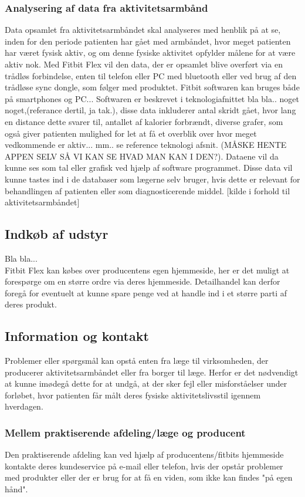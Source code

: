\subsubsection{Analysering af data fra aktivitetsarmbånd}  
Data opsamlet fra aktivitetsarmbåndet skal analyseres med henblik på at se, inden for den periode patienten har gået med armbåndet, hvor meget patienten har været fysisk aktiv, og om denne fysiske aktivitet opfylder målene for at være aktiv nok.  
Med Fitbit Flex vil den data, der er opsamlet blive overført via en trådløs forbindelse, enten til telefon eller PC med bluetooth eller ved brug af den trådløse sync dongle, som følger med produktet. Fitbit softwaren kan bruges både på smartphones og PC... Softwaren er beskrevet i teknologiafnittet bla bla.. noget noget,(referance dertil, ja tak.), disse data inkluderer antal skridt gået, hvor lang en distance dette svarer til, antallet af kalorier forbrændt, diverse grafer, som også giver patienten mulighed for let at få et overblik over hvor meget vedkommende er aktiv... mm.. se reference teknologi afsnit. (MÅSKE HENTE APPEN SELV SÅ VI KAN SE HVAD MAN KAN I DEN?). Dataene vil da kunne ses som tal eller grafisk ved hjælp af software programmet. Disse data vil kunne tastes ind i de databaser som lægerne selv bruger, hvis dette er relevant for behandlingen af patienten eller som diagnosticerende middel. [kilde i forhold til aktivitetsarmbåndet]

\subsection{Indkøb af udstyr}	
Bla bla...\\
Fitbit Flex kan købes over producentens egen hjemmeside, her er det muligt at forespørge om en større ordre via deres hjemmeside. Detailhandel kan derfor foregå for eventuelt at kunne spare penge ved at handle ind i et større parti af deres produkt.

\subsection{Information og kontakt}
Problemer eller spørgsmål kan opstå enten fra læge til virksomheden, der producerer aktivitetsarmbåndet eller fra borger til læge. Herfor er det nødvendigt at kunne imødegå dette for at undgå, at der sker fejl eller misforståelser under forløbet, hvor patienten får målt deres fysiske aktivitetslivsstil igennem hverdagen. 

\subsubsection{Mellem praktiserende afdeling/læge og producent}
Den praktiserende afdeling kan ved hjælp af producentens/fitbits hjemmeside kontakte deres kundeservice på e-mail eller telefon, hvis der opstår problemer med produkter eller der er brug for at få en viden, som ikke kan findes "på egen hånd". 


